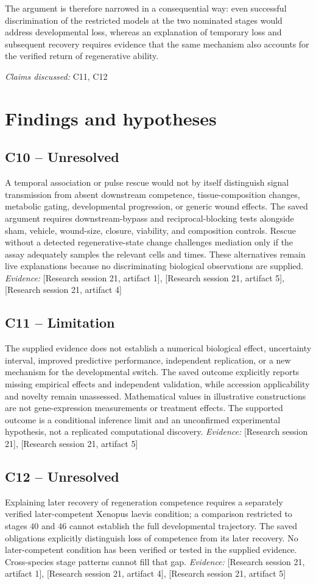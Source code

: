 \documentclass[11pt]{article}
\begin{document}
The argument is therefore narrowed in a consequential way: even successful discrimination of the restricted models at the two nominated stages would address developmental loss, whereas an explanation of temporary loss and subsequent recovery requires evidence that the same mechanism also accounts for the verified return of regenerative ability.

\textit{Claims discussed: }C11, C12
\section{Findings and hypotheses}
\subsection{C10 -- Unresolved}
A temporal association or pulse rescue would not by itself distinguish signal transmission from absent downstream competence, tissue-composition changes, metabolic gating, developmental progression, or generic wound effects.
The saved argument requires downstream-bypass and reciprocal-blocking tests alongside sham, vehicle, wound-size, closure, viability, and composition controls. Rescue without a detected regenerative-state change challenges mediation only if the assay adequately samples the relevant cells and times. These alternatives remain live explanations because no discriminating biological observations are supplied.
\textit{Evidence: }[Research session 21, artifact 1], [Research session 21, artifact 5], [Research session 21, artifact 4]
\subsection{C11 -- Limitation}
The supplied evidence does not establish a numerical biological effect, uncertainty interval, improved predictive performance, independent replication, or a new mechanism for the developmental switch.
The saved outcome explicitly reports missing empirical effects and independent validation, while accession applicability and novelty remain unassessed. Mathematical values in illustrative constructions are not gene-expression measurements or treatment effects. The supported outcome is a conditional inference limit and an unconfirmed experimental hypothesis, not a replicated computational discovery.
\textit{Evidence: }[Research session 21], [Research session 21, artifact 5]
\subsection{C12 -- Unresolved}
Explaining later recovery of regeneration competence requires a separately verified later-competent Xenopus laevis condition; a comparison restricted to stages $40$ and $46$ cannot establish the full developmental trajectory.
The saved obligations explicitly distinguish loss of competence from its later recovery. No later-competent condition has been verified or tested in the supplied evidence. Cross-species stage patterns cannot fill that gap.
\textit{Evidence: }[Research session 21, artifact 1], [Research session 21, artifact 4], [Research session 21, artifact 5]
\end{document}
